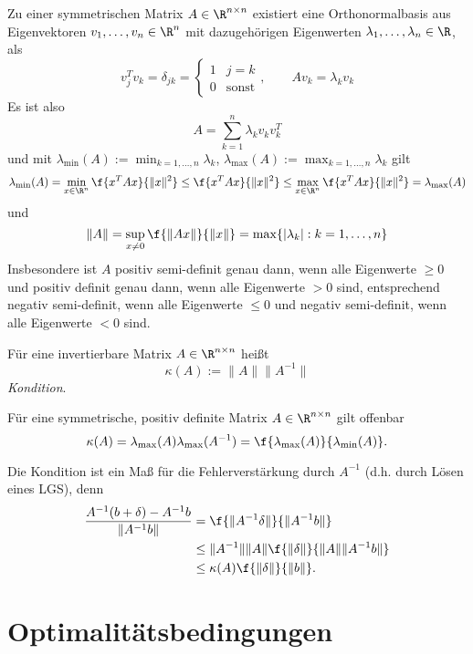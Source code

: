 \begin{st} \label{2.6}
	Zu einer symmetrischen Matrix $A \in \R^{n\times n}$ existiert eine Orthonormalbasis aus Eigenvektoren $v_1, \dotsc, v_n \in \R^n$ mit dazugehörigen Eigenwerten $\lambda_1, \dotsc, \lambda_n \in \R$, als
	\[
		v_j^T v_k
		= \delta_{jk}
		= \begin{cases}
			1 & j = k \\
			0 & \text{sonst}
		\end{cases},\qquad
		Av_k = \lambda_k v_k
	\]
	Es ist also
	\[
		A = \sum_{k=1}^n \lambda_k v_k v_k^T
	\]
	und mit $\lambda_{\text{min}}(A) := \min_{k=1,\dotsc,n} \lambda_k$, $\lambda_{\text{max}}(A) := \max_{k=1,\dotsc,n} \lambda_k$ gilt
	\[
		\lambda_{\text{min}}(A)
		= \min_{x\in\R^n} \f {x^T A x}{\|x\|^2}
		\le \f {x^T A x}{\|x\|^2}
		\le \max_{x\in\R^n} \f {x^TA x}{\|x\|^2}
		= \lambda_{\text{max}}(A)
	\]
	und
	\[
		\|A\|
		= \sup_{x\neq 0} \f{\|Ax\|}{\|x\|}
		= \max \{|\lambda_k| : k=1, \dotsc, n \}
	\]
	Insbesondere ist $A$ positiv semi-definit genau dann, wenn alle Eigenwerte $\ge 0$ und positiv definit genau dann, wenn alle Eigenwerte $>0$ sind,
	entsprechend negativ semi-definit, wenn alle Eigenwerte $\le 0$ und negativ semi-definit, wenn alle Eigenwerte $<0$ sind.
\end{st}

\begin{df} \label{2.7}
	Für eine invertierbare Matrix $A \in \R^{n\times n}$ heißt
	\[
		\kappa(A)
		:= \|A\| \|A^{-1}\|
	\]
	\emph{Kondition}.

	Für eine symmetrische, positiv definite Matrix $A \in \R^{n\times n}$ gilt offenbar
	\[
		\kappa(A)
		= \lambda_{\text{max}}(A) \lambda_{\text{max}}(A^{-1})
		= \f {\lambda_{\text{max}}(A)}{\lambda_{\text{min}}(A)}.
	\]
\end{df}

\begin{nt} \label{2.8}
	Die Kondition ist ein Maß für die Fehlerverstärkung durch $A^{-1}$ (d.h. durch Lösen eines LGS), denn
	\begin{align*}
		\dfrac {A^{-1}(b+\delta) - A^{-1}b}{\|A^{-1}b\|}
		&= \f {\|A^{-1}\delta\|}{\|A^{-1}b\|} \\
		&\le \|A^{-1}\| \|A\| \f {\|\delta\|}{\|A\|\|A^{-1}b\|} \\
		&\le \kappa(A) \f {\|\delta\|}{\|b\|}.
	\end{align*}
\end{nt}

\section{Optimalitätsbedingungen}

